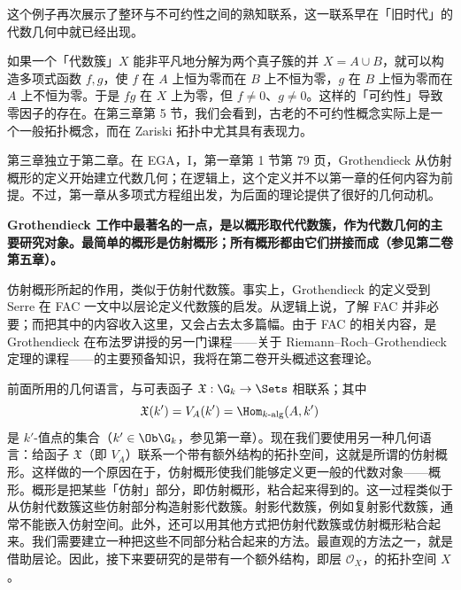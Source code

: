 这个例子再次展示了整环与不可约性之间的熟知联系，这一联系早在「旧时代」的代数几何中就已经出现。
\begin{center}
\end{center}
如果一个「代数簇」$X$ 能非平凡地分解为两个真子簇的并 $X=A\cup B$，就可以构造多项式函数 $f,g$，使 $f$ 在 $A$ 上恒为零而在 $B$ 上不恒为零，$g$ 在 $B$ 上恒为零而在 $A$ 上不恒为零。于是 $fg$ 在 $X$ 上为零，但 $f\ne0$、$g\ne0$。这样的「可约性」导致零因子的存在。在第三章第 5 节，我们会看到，古老的不可约性概念实际上是一个一般拓扑概念，而在 Zariski 拓扑中尤其具有表现力。

第三章独立于第二章。在 EGA，I，第一章第 1 节第 79 页，Grothendieck 从仿射概形的定义开始建立代数几何；在逻辑上，这个定义并不以第一章的任何内容为前提。不过，第一章从多项式方程组出发，为后面的理论提供了很好的几何动机。

\textbf{Grothendieck 工作中最著名的一点，是以概形取代代数簇，作为代数几何的主要研究对象。最简单的概形是仿射概形；所有概形都由它们拼接而成（参见第二卷第五章）。}

仿射概形所起的作用，类似于仿射代数簇。事实上，Grothendieck 的定义受到 Serre 在 FAC 一文中以层论定义代数簇的启发。从逻辑上说，了解 FAC 并非必要；而把其中的内容收入这里，又会占去太多篇幅。由于 FAC 的相关内容，是 Grothendieck 在布法罗讲授的另一门课程——关于 Riemann--Roch--Grothendieck 定理的课程——的主要预备知识，我将在第二卷开头概述这套理论。

前面所用的几何语言，与可表函子 $\mathfrak X:\G_k\to\Sets$ 相联系；其中
\[
\mathfrak X(k')=V_A(k')=\Hom_{k\text{-alg}}(A,k')
\]
是 $k'$-值点的集合（$k'\in\Ob\G_k$，参见第一章）。现在我们要使用另一种几何语言：给函子 $\mathfrak X$（即 $V_A$）联系一个带有额外结构的拓扑空间，这就是所谓的仿射概形。这样做的一个原因在于，仿射概形使我们能够定义更一般的代数对象——概形。概形是把某些「仿射」部分，即仿射概形，粘合起来得到的。这一过程类似于从仿射代数簇这些仿射部分构造射影代数簇。射影代数簇，例如复射影代数簇，通常不能嵌入仿射空间。此外，还可以用其他方式把仿射代数簇或仿射概形粘合起来。我们需要建立一种把这些不同部分粘合起来的方法。最直观的方法之一，就是借助层论。因此，接下来要研究的是带有一个额外结构，即层 $\mathcal O_X$，的拓扑空间 $X$。

